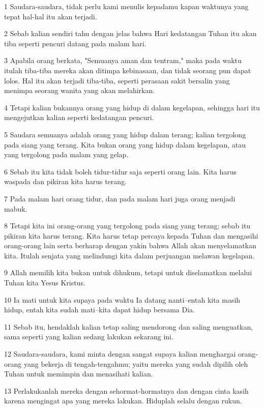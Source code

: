 \par 1 Saudara-saudara, tidak perlu kami menulis kepadamu kapan waktunya yang tepat hal-hal itu akan terjadi.
\par 2 Sebab kalian sendiri tahu dengan jelas bahwa Hari kedatangan Tuhan itu akan tiba seperti pencuri datang pada malam hari.
\par 3 Apabila orang berkata, "Semuanya aman dan tentram," maka pada waktu itulah tiba-tiba mereka akan ditimpa kebinasaan, dan tidak seorang pun dapat lolos. Hal itu akan terjadi tiba-tiba, seperti perasaan sakit bersalin yang menimpa seorang wanita yang akan melahirkan.
\par 4 Tetapi kalian bukannya orang yang hidup di dalam kegelapan, sehingga hari itu mengejutkan kalian seperti kedatangan pencuri.
\par 5 Saudara semuanya adalah orang yang hidup dalam terang; kalian tergolong pada siang yang terang. Kita bukan orang yang hidup dalam kegelapan, atau yang tergolong pada malam yang gelap.
\par 6 Sebab itu kita tidak boleh tidur-tidur saja seperti orang lain. Kita harus waspada dan pikiran kita harus terang.
\par 7 Pada malam hari orang tidur, dan pada malam hari juga orang menjadi mabuk.
\par 8 Tetapi kita ini orang-orang yang tergolong pada siang yang terang; sebab itu pikiran kita harus terang. Kita harus tetap percaya kepada Tuhan dan mengasihi orang-orang lain serta berharap dengan yakin bahwa Allah akan menyelamatkan kita. Itulah senjata yang melindungi kita dalam perjuangan melawan kegelapan.
\par 9 Allah memilih kita bukan untuk dihukum, tetapi untuk diselamatkan melalui Tuhan kita Yesus Kristus.
\par 10 Ia mati untuk kita supaya pada waktu Ia datang nanti--entah kita masih hidup, entah kita sudah mati--kita dapat hidup bersama Dia.
\par 11 Sebab itu, hendaklah kalian tetap saling mendorong dan saling menguatkan, sama seperti yang kalian sedang lakukan sekarang ini.
\par 12 Saudara-saudara, kami minta dengan sangat supaya kalian menghargai orang-orang yang bekerja di tengah-tengahmu; yaitu mereka yang sudah dipilih oleh Tuhan untuk memimpin dan menasihati kalian.
\par 13 Perlakukanlah mereka dengan sehormat-hormatnya dan dengan cinta kasih karena mengingat apa yang mereka lakukan. Hiduplah selalu dengan rukun.
